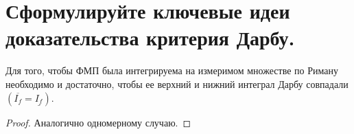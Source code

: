 \section{Сформулируйте ключевые идеи доказательства критерия Дарбу.}
\begin{theorem}
    Для того, чтобы ФМП была интегрируема на измеримом множестве по Риману необходимо и достаточно, чтобы ее верхний и нижний интеграл Дарбу совпадали $(\overline{I_f} = \underline{I_f})$.
    \begin{proof}
        Аналогично одномерному случаю.
    \end{proof}
\end{theorem}
